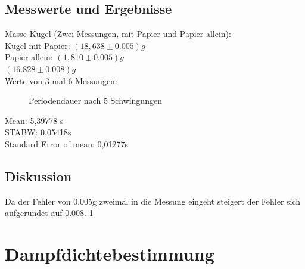 \documentclass[12pt,a4paper]{article}
\begin{document}
\begin{multicols}{2}
\subsection{Messwerte und Ergebnisse}

Masse Kugel (Zwei Messungen, mit Papier und Papier allein):\\
Kugel mit Papier: $(18,638 \pm 0.005)g$\\
Papier allein: $(1,810 \pm 0.005)g$\\
$(16.828 \pm 0.008)g$ \\
Werte von 3 mal 6 Messungen:
\begin{figure}[H]
	\centering
	\caption{Periodendauer nach 5 Schwingungen}
	\label{fig:adiabaten_periode_messung}
\end{figure}
\noindent
Mean: 5,39778 s\\
STABW: 0,05418s\\
Standard Error of mean: 0,01277s\\

\subsection{Diskussion}
Da der Fehler von 0.005g zweimal in die Messung eingeht steigert der Fehler sich aufgerundet auf 0.008.
\ref{fig:adiabaten_periode_messung}



\section{Dampfdichtebestimmung}




\end{multicols}
\end{document}
